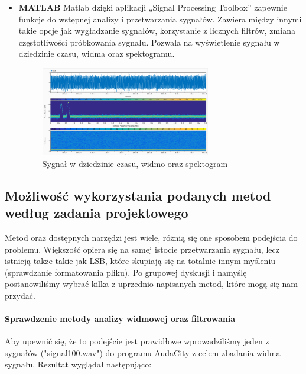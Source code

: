 \documentclass[a4paper,titleauthor]{mwart}
\begin{document}
\begin{itemize}
	\item \textbf{MATLAB} \newline\newline
	Matlab dzięki aplikacji „Signal Processing Toolbox” zapewnie funkcje do wstępnej analizy i przetwarzania sygnałów. Zawiera między innymi takie opcje jak wygładzanie sygnałów, korzystanie z licznych filtrów, zmiana częstotliwości próbkowania sygnału. \newline
	Pozwala na wyświetlenie sygnału w dziedzinie czasu, widma oraz spektogramu.\newline
	
	\begin{figure}[h]
		\centering
		\includegraphics[width=0.7\textwidth]{matlab1.PNG}
		\caption{Sygnał w dziedzinie czasu, widmo oraz spektogram}
	\end{figure}
	
\end{itemize}

\subsection{Możliwość wykorzystania podanych metod według zadania projektowego}


Metod oraz dostępnych narzędzi jest wiele, różnią się one sposobem podejścia do problemu. Większość opiera się na samej istocie przetwarzania sygnału, lecz istnieją także takie jak LSB, które skupiają się na totalnie innym myśleniu (sprawdzanie formatowania pliku). Po grupowej dyskusji i namyślę postanowiliśmy wybrać kilka z uprzednio napisanych metod, które mogą się nam przydać.

\paragraph{Sprawdzenie metody analizy widmowej oraz filtrowania}
Aby upewnić się, że to podejście jest prawidłowe wprowadziliśmy jeden z sygnałów ("signal100.wav") do programu AudaCity z celem zbadania widma sygnału. Rezultat wyglądał następująco:
\end{document}
